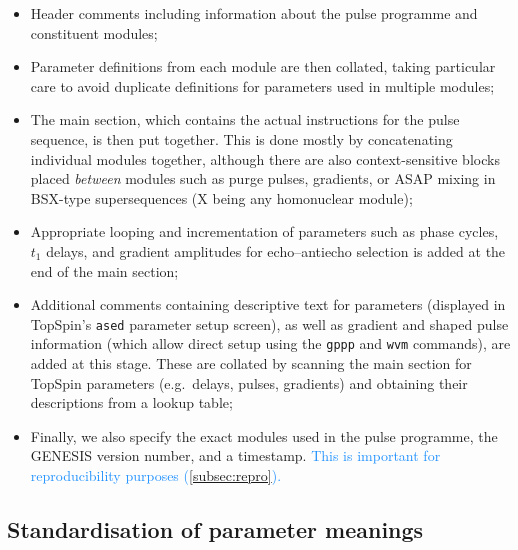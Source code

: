 \documentclass[a4paper,11pt]{article}
\newcommand{\changed}[1]{\textcolor{DodgerBlue}{#1}}
\begin{document}
\begin{refsection}
\begin{itemize}
    \item Header comments including information about the pulse programme and constituent modules;
    \item Parameter definitions from each module are then collated, taking particular care to avoid duplicate definitions for parameters used in multiple modules;
    \item The main section, which contains the actual instructions for the pulse sequence, is then put together.
        This is done mostly by concatenating individual modules together, although there are also context-sensitive blocks placed \textit{between} modules such as purge pulses, gradients, or ASAP mixing\autocite{Claridge2019MRC} in BSX-type supersequences (X being any homonuclear module);
    \item Appropriate looping and incrementation of parameters such as phase cycles, \(t_1\) delays, and gradient amplitudes for echo--antiecho selection is added at the end of the main section;
    \item Additional comments containing descriptive text for parameters (displayed in TopSpin's \texttt{ased} parameter setup screen), as well as gradient and shaped pulse information (which allow direct setup using the \texttt{gppp} and \texttt{wvm} commands), are added at this stage.
        These are collated by scanning the main section for TopSpin parameters (e.g.\ delays, pulses, gradients) and obtaining their descriptions from a lookup table;
    \item Finally, we also specify the exact modules used in the pulse programme, the GENESIS version number, and a timestamp. \changed{This is important for reproducibility purposes (\cref{subsec:repro}).}
\end{itemize}


\subsection{Standardisation of parameter meanings}


\end{refsection}
\end{document}
